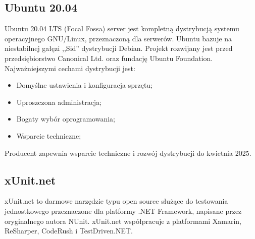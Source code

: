 \documentclass[12pt,a4paper]{article}
\begin{document}
		\subsection{Ubuntu 20.04}		
		\indent Ubuntu 20.04 LTS (Focal Fossa) server jest kompletną dystrybucją systemu operacyjnego GNU/Linux, przeznaczoną dla serwerów. Ubuntu bazuje na niestabilnej gałęzi ,,Sid''
			dystrybucji Debian. Projekt rozwijany jest przed przedsiębiorstwo Canonical Ltd. oraz fundację Ubuntu Foundation. Najważniejszymi cechami dystrybucji jest:
			\begin{itemize}
				\item Domyślne ustawienia i konfiguracja sprzętu;
				\item Uproszczona administracja;
				\item Bogaty wybór oprogramowania;
				\item Wsparcie techniczne;
			\end{itemize}
			Producent zapewnia wsparcie techniczne i rozwój dystrybucji do kwietnia 2025.
			
		\subsection{xUnit.net}
			\indent xUnit.net to darmowe narzędzie typu open source służące do testowania jednostkowego
			przeznaczone dla platformy .NET Framework, napisane przez oryginalnego autora NUnit.
			xUnit.net współpracuje z platformami Xamarin, ReSharper, CodeRush i TestDriven.NET.
		
\end{document}
